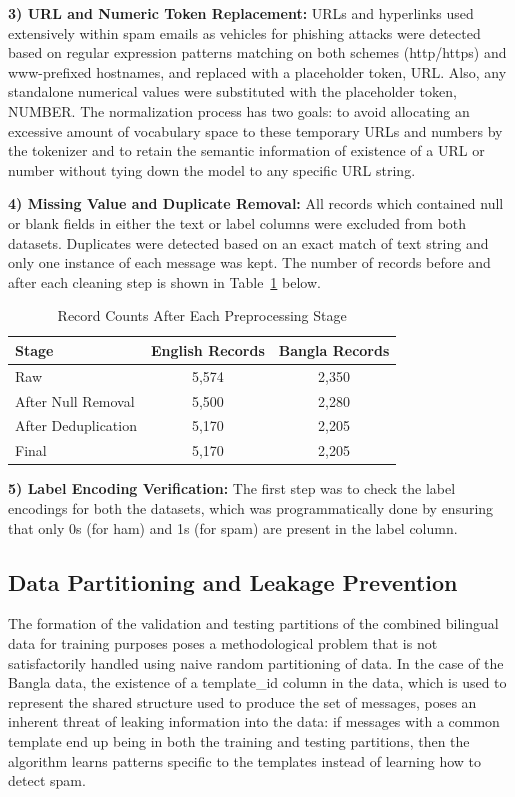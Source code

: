 \documentclass[journal]{IEEEtran}
\begin{document}
\textbf{3) URL and Numeric Token Replacement:} URLs and hyperlinks used
extensively within spam emails as vehicles for phishing attacks were
detected based on regular expression patterns matching on both schemes
(http/https) and www-prefixed hostnames, and replaced with a placeholder
token, URL. Also, any standalone numerical values were substituted with
the placeholder token, NUMBER. The normalization process has two goals:
to avoid allocating an excessive amount of vocabulary space to these
temporary URLs and numbers by the tokenizer and to retain the semantic
information of existence of a URL or number without tying down the model
to any specific URL string.

\textbf{4) Missing Value and Duplicate Removal:} All records which contained
null or blank fields in either the text or label columns were excluded
from both datasets. Duplicates were detected based on an exact match of
text string and only one instance of each message was kept. The number
of records before and after each cleaning step is shown in Table~\ref{tab:dataset_prep}
below.

\begin{table}[htbp]
\caption{Record Counts After Each Preprocessing Stage}
\label{tab:dataset_prep}
\begin{center}
\begin{tabular}{lcc}
\toprule
\textbf{Stage} & \textbf{English Records} & \textbf{Bangla Records} \\
\midrule
Raw & 5,574 & 2,350 \\
After Null Removal & 5,500 & 2,280 \\
After Deduplication & 5,170 & 2,205 \\
Final & 5,170 & 2,205 \\
\bottomrule
\end{tabular}
\end{center}
\end{table}

\textbf{5) Label Encoding Verification:} The first step was to check the
label encodings for both the datasets, which was programmatically done
by ensuring that only 0s (for ham) and 1s (for spam) are present in the
label column.

\subsection{Data Partitioning and Leakage Prevention}

The formation of the validation and testing partitions of the combined
bilingual data for training purposes poses a methodological problem that
is not satisfactorily handled using naive random partitioning of data.
In the case of the Bangla data, the existence of a template\_id column in
the data, which is used to represent the shared structure used to
produce the set of messages, poses an inherent threat of leaking
information into the data: if messages with a common template end up
being in both the training and testing partitions, then the algorithm
learns patterns specific to the templates instead of learning how to
detect spam.
\end{document}
